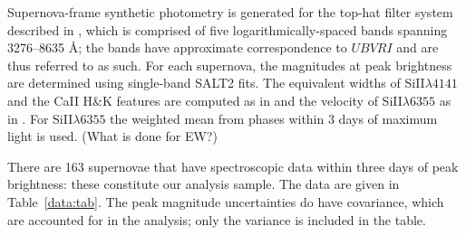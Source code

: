 \documentclass{aastex}   	%
\begin{document}
Supernova-frame synthetic photometry is generated for the top-hat filter system
described in \citet{2011A&A...529L...4C}, which is comprised of five logarithmically-spaced bands spanning
3276--8635 \AA; the bands have approximate correspondence to $UBVRI$ and are thus referred to as such.
For each supernova, the magnitudes at peak brightness are determined using single-band SALT2 fits.
The equivalent widths of SiII$\lambda 4141$ and the CaII H\&K features are computed as
in \citet{2008A&A...477..717B} and the velocity of SiII$\lambda 6355$ as in \citet{chotard:thesis}.
For  SiII$\lambda 6355$ the weighted mean from phases within 3 days of maximum light is used.
(What is done for EW?)

There are 163 supernovae that have spectroscopic data within three days of peak brightness:
these constitute our analysis sample.  The data are given in Table~\ref{data:tab}.
The peak magnitude uncertainties do have covariance, which are accounted
for in the analysis; only the variance is included in the table.
\end{document}
